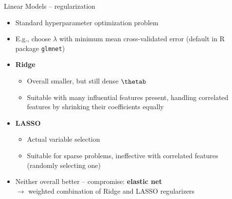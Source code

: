 
\begin{frame}{Linear Models -- regularization}


\begin{itemize}
  \item Standard hyperparameter optimization problem
  \item E.g., choose $\lambda$ with minimum mean cross-validated error 
  (default in R package \texttt{glmnet})
\end{itemize}

\medskip


\begin{itemize}
  \item \textbf{Ridge}
  \begin{itemize} 
    \item Overall smaller, but still dense $\thetab$
    \item Suitable with many influential features present, handling correlated 
    features by shrinking their coefficients equally
  \end{itemize}
  \item \textbf{LASSO}
  \begin{itemize} 
    \item Actual variable selection
    \item Suitable for sparse problems, ineffective with correlated 
    features (randomly selecting one)
  \end{itemize}  
  \item Neither overall better -- compromise: \textbf{elastic net} \\
  $\rightarrow$ weighted 
  combination of Ridge and LASSO regularizers
\end{itemize}


\end{frame}



